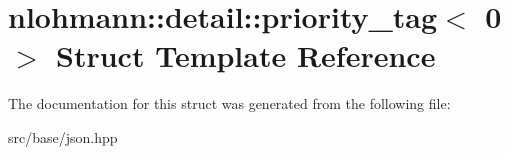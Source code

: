 \hypertarget{structnlohmann_1_1detail_1_1priority__tag_3_010_01_4}{}\section{nlohmann\+:\+:detail\+:\+:priority\+\_\+tag$<$ 0 $>$ Struct Template Reference}
\label{structnlohmann_1_1detail_1_1priority__tag_3_010_01_4}


The documentation for this struct was generated from the following file\+:\begin{DoxyCompactItemize}
\item 
src/base/json.\+hpp\end{DoxyCompactItemize}
